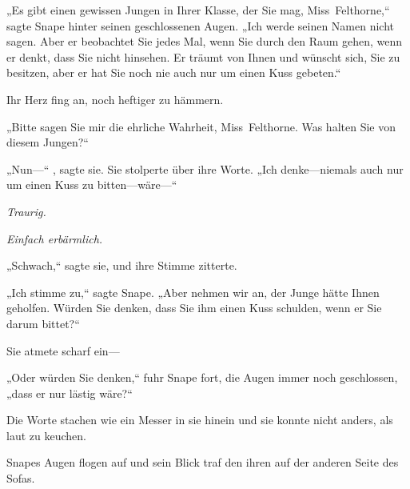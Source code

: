 „Es gibt einen gewissen Jungen in Ihrer Klasse, der Sie mag, Miss~Felthorne,“ sagte Snape hinter seinen geschlossenen Augen. „Ich werde seinen Namen nicht sagen. Aber er beobachtet Sie jedes Mal, wenn Sie durch den Raum gehen, wenn er denkt, dass Sie nicht hinsehen. Er träumt von Ihnen und wünscht sich, Sie zu besitzen, aber er hat Sie noch nie auch nur um einen Kuss gebeten.“

Ihr Herz fing an, noch heftiger zu hämmern.

„Bitte sagen Sie mir die ehrliche Wahrheit, Miss~Felthorne. Was halten Sie von diesem Jungen?“

„Nun—“ , sagte sie. Sie stolperte über ihre Worte. „Ich denke—niemals auch nur um einen Kuss zu bitten—wäre—“

\emph{Traurig.}

\emph{Einfach erbärmlich.}

„Schwach,“ sagte sie, und ihre Stimme zitterte.

„Ich stimme zu,“ sagte Snape. „Aber nehmen wir an, der Junge hätte Ihnen geholfen. Würden Sie denken, dass Sie ihm einen Kuss schulden, wenn er Sie darum bittet?“

Sie atmete scharf ein—

„Oder würden Sie denken,“ fuhr Snape fort, die Augen immer noch geschlossen, „dass er nur lästig wäre?“

Die Worte stachen wie ein Messer in sie hinein und sie konnte nicht anders, als laut zu keuchen.

Snapes Augen flogen auf und sein Blick traf den ihren auf der anderen Seite des Sofas.

